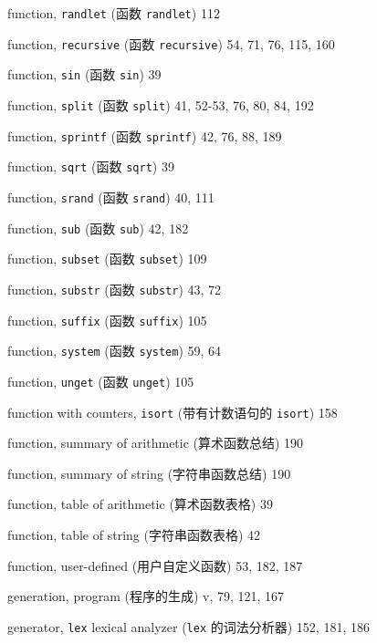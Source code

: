 \begin{multicols}{3}
\hangindent=3pc  function, \verb'randlet' (函数 \verb'randlet') 112

\hangindent=3pc  function, \verb'recursive' (函数 \verb'recursive')
54, 71, 76, 115, 160

\hangindent=3pc  function, \verb'sin' (函数 \verb'sin') 39

\hangindent=3pc  function, \verb'split' (函数 \verb'split')
41, 52-53, 76, 80, 84, 192

\hangindent=3pc  function, \verb'sprintf' (函数 \verb'sprintf')
42, 76, 88, 189

\hangindent=3pc  function, \verb'sqrt' (函数 \verb'sqrt') 39

\hangindent=3pc  function, \verb'srand' (函数 \verb'srand') 40, 111

\hangindent=3pc  function, \verb'sub' (函数 \verb'sub') 42, 182

\hangindent=3pc  function, \verb'subset' (函数 \verb'subset') 109

\hangindent=3pc  function, \verb'substr' (函数 \verb'substr') 43, 72

\hangindent=3pc  function, \verb'suffix' (函数 \verb'suffix') 105

\hangindent=3pc  function, \verb'system' (函数 \verb'system') 59, 64

\hangindent=3pc  function, \verb'unget' (函数 \verb'unget') 105

\hangindent=3pc  function with counters, \verb'isort'
(带有计数语句的 \verb'isort') 158

\hangindent=3pc  function, summary of arithmetic (算术函数总结) 190

\hangindent=3pc  function, summary of string (字符串函数总结) 190

\hangindent=3pc  function, table of arithmetic (算术函数表格) 39

\hangindent=3pc  function, table of string (字符串函数表格) 42

\hangindent=3pc  function, user-defined (用户自定义函数) 53, 182, 187

\hangindent=3pc  generation, program (程序的生成) v, 79, 121, 167

\hangindent=3pc  generator, \verb'lex' lexical analyzer
(\verb'lex' 的词法分析器) 152, 181, 186


\end{multicols}
